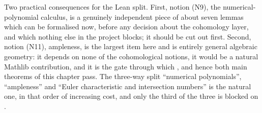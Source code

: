 Two practical consequences for the Lean split.  First, notion (N9), the
numerical-polynomial calculus, is a genuinely independent piece of about seven
lemmas which can be formalised now, before any decision about the cohomology
layer, and which nothing else in the project blocks; it should be cut out
first.  Second, notion (N11), ampleness, is the largest item here and is
entirely general algebraic geometry: it depends on none of the cohomological
notions, it would be a natural Mathlib contribution, and it is the gate through
which ,  and hence
both main theorems of this chapter pass.  The three-way split ``numerical
polynomials'', ``ampleness'' and ``Euler characteristic and intersection
numbers'' is the natural one, in that order of increasing cost, and only the
third of the three is blocked on .
